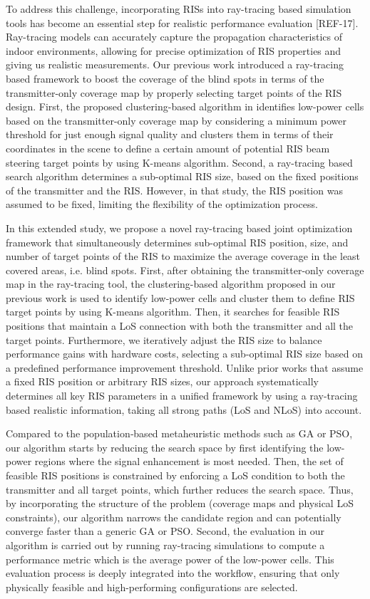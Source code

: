 \documentclass{IEEEoj}
\begin{document}
To address this challenge, incorporating RISs into ray-tracing based simulation tools has become an essential step for realistic performance evaluation [REF-17]. Ray-tracing models can accurately capture the propagation characteristics of indoor environments, allowing for precise optimization of RIS properties and giving us realistic measurements. Our previous work \cite{emre_claude_eucap_paper} introduced a ray-tracing based framework to boost the coverage of the blind spots in terms of the transmitter-only coverage map by properly selecting target points of the RIS design. First, the proposed clustering-based algorithm in \cite{emre_claude_eucap_paper} identifies low-power cells based on the transmitter-only coverage map by considering a minimum power threshold for just enough signal quality and clusters them in terms of their coordinates in the scene to define a certain amount of potential RIS beam steering target points by using K-means algorithm. Second, a ray-tracing based search algorithm determines a sub-optimal RIS size, based on the fixed positions of the transmitter and the RIS. However, in that study, the RIS position was assumed to be fixed, limiting the flexibility of the optimization process.

In this extended study, we propose a novel ray-tracing based joint optimization framework that simultaneously determines sub-optimal RIS position, size, and number of target points of the RIS to maximize the average coverage in the least covered areas, i.e. blind spots. First, after obtaining the transmitter-only coverage map in the ray-tracing tool, the clustering-based algorithm proposed in our previous work \cite{emre_claude_eucap_paper} is used to identify low-power cells and cluster them to define RIS target points by using K-means algorithm. Then, it searches for feasible RIS positions that maintain a LoS connection with both the transmitter and all the target points. Furthermore, we iteratively adjust the RIS size to balance performance gains with hardware costs, selecting a sub-optimal RIS size based on a predefined performance improvement threshold. Unlike prior works that assume a fixed RIS position or arbitrary RIS sizes, our approach systematically determines all key RIS parameters in a unified framework by using a ray-tracing based realistic information, taking all strong paths (LoS and NLoS) into account.

Compared to the population‐based metaheuristic methods such as GA or PSO, our algorithm starts by reducing the search space by first identifying the low-power regions where the signal enhancement is most needed. Then, the set of feasible RIS positions is constrained by enforcing a LoS condition to both the transmitter and all target points, which further reduces the search space. Thus, by incorporating the structure of the problem (coverage maps and physical LoS constraints), our algorithm narrows the candidate region and can potentially converge faster than a generic GA or PSO. Second, the evaluation in our algorithm is carried out by running ray-tracing simulations to compute a performance metric which is the average power of the low-power cells. This evaluation process is deeply integrated into the workflow, ensuring that only physically feasible and high-performing configurations are selected.
\end{document}
